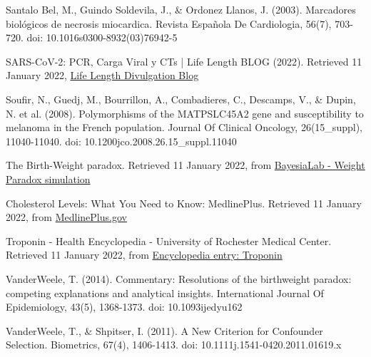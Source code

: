 \documentclass{article}
\begin{document}
Santalo Bel, M., Guindo Soldevila, J., \& Ordonez Llanos, J. (2003). Marcadores biológicos de necrosis miocardica. Revista Española De Cardiologia, 56(7), 703-720. doi: 10.1016\/s0300-8932(03)76942-5

SARS-CoV-2: PCR, Carga Viral y CTs | Life Length BLOG (2022). Retrieved 11 January 2022, \href{from https://lifelength.com/es/sars-cov-2-pcr-carga-viral-y-cts/}{Life Length Divulgation Blog}

Soufir, N., Guedj, M., Bourrillon, A., Combadieres, C., Descamps, V., \& Dupin, N. et al. (2008). Polymorphisms of the MATP\/SLC45A2 gene and susceptibility to melanoma in the French population. Journal Of Clinical Oncology, 26(15\_suppl), 11040-11040. doi: 10.1200\/jco.2008.26.15\_suppl.11040

The Birth-Weight paradox. Retrieved 11 January 2022, from \href{https://library.bayesia.com/articles/#!bayesialab-knowledge-hub/the-birth-weight-paradox}{BayesiaLab - Weight Paradox simulation}

Cholesterol Levels: What You Need to Know: MedlinePlus. Retrieved 11 January 2022, from \href{https://medlineplus.gov/cholesterollevelswhatyouneedtoknow.html}{MedlinePlus.gov}

Troponin - Health Encyclopedia - University of Rochester Medical Center. Retrieved 11 January 2022, from \href{https://www.urmc.rochester.edu/encyclopedia/content.aspx?contenttypeid=167&contentid=troponin}{Encyclopedia entry: Troponin}

VanderWeele, T. (2014). Commentary: Resolutions of the birthweight paradox: competing explanations and analytical insights. International Journal Of Epidemiology, 43(5), 1368-1373. doi: 10.1093\/ije\/dyu162

VanderWeele, T., \& Shpitser, I. (2011). A New Criterion for Confounder Selection. Biometrics, 67(4), 1406-1413. doi: 10.1111\/j.1541-0420.2011.01619.x
\end{document}
